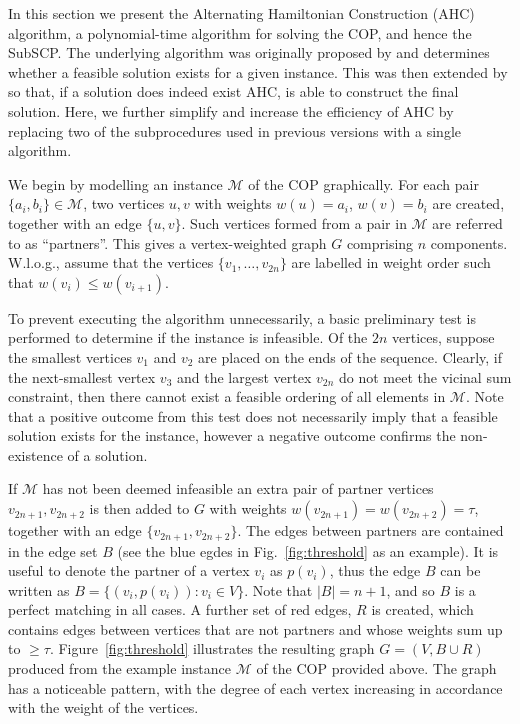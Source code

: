 \documentclass[authoryear]{elsarticle}
\begin{document}
In this section we present the Alternating Hamiltonian Construction (AHC) algorithm, a polynomial-time algorithm for solving the COP, and hence the SubSCP. The underlying algorithm was originally proposed by \citet{becker2010} and determines whether a feasible solution exists for a given instance. This was then extended by \citet{hawa2018} so that, if a solution does indeed exist AHC, is able to construct the final solution. Here, we further simplify and increase the efficiency of AHC by replacing two of the subprocedures used in previous versions with a single algorithm.


We begin by modelling an instance $\mathcal{M}$ of the COP graphically. For each pair $\{a_i, b_i\} \in \mathcal{M}$, two vertices $u, v$ with weights $w(u) = a_i$, $w(v) = b_i$ are created, together with an edge $\{u, v\}$. Such vertices formed from a pair in $\mathcal{M}$ are referred to as ``partners''. This gives a vertex-weighted graph $G$ comprising $n$ components. W.l.o.g., assume that the vertices $\{v_1,\dotsc,v_{2n}\}$ are labelled in weight order such that $w(v_i) \leq w(v_{i+1})$.

To prevent executing the algorithm unnecessarily, a basic preliminary test is performed to determine if the instance is infeasible. Of the $2n$ vertices, suppose the smallest vertices $v_1$ and $v_2$ are placed on the ends of the sequence. Clearly, if the next-smallest vertex $v_3$ and the largest vertex $v_{2n}$ do not meet the vicinal sum constraint, then there cannot exist a feasible ordering of all elements in $\mathcal{M}$. Note that a positive outcome from this test does not necessarily imply that a feasible solution exists for the instance, however a negative outcome confirms the non-existence of a solution.

If $\mathcal{M}$ has not been deemed infeasible an extra pair of partner vertices $v_{2n+1}, v_{2n+2}$ is then added to $G$ with weights $w(v_{2n+1}) = w(v_{2n+2}) = \tau$, together with an edge $\{v_{2n+1}, v_{2n+2}\}$. The edges between partners are contained in the edge set $B$ (see the blue egdes in Fig.~\ref{fig:threshold} as an example). It is useful to denote the partner of a vertex $v_i$ as $p(v_i)$, thus the edge $B$ can be written as $B = \{(v_i, p(v_i)) : v_i \in V\}$. Note that $|B| = n+1$, and so $B$ is a perfect matching in all cases. A further set of red edges, $R$ is created, which contains edges between vertices that are not partners and whose weights sum up to $\geq \tau$. Figure~\ref{fig:threshold} illustrates the resulting graph $G = (V, B \cup R)$ produced from the example instance $\mathcal{M}$ of the COP provided above. The graph has a noticeable pattern, with the degree of each vertex increasing in accordance with the weight of the vertices. 
\end{document}
